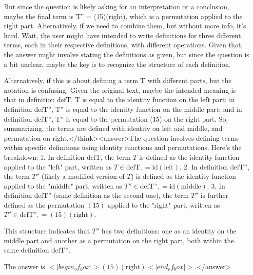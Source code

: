 But since the question is likely asking for an interpretation or a conclusion, maybe the final term is T'' = (15)(right), which is a permutation applied to the right part. Alternatively, if we need to combine them, but without more info, it's hard. Wait, the user might have intended to write definitions for three different terms, each in their respective definitions, with different operations. Given that, the answer might involve stating the definitions as given, but since the question is a bit unclear, maybe the key is to recognize the structure of each definition. 

Alternatively, if this is about defining a term T with different parts, but the notation is confusing. Given the original text, maybe the intended meaning is that in definition defT, T is equal to the identity function on the left part; in definition defT'', T'' is equal to the identity function on the middle part; and in definition defT'', T'' is equal to the permutation (15) on the right part. So, summarizing, the terms are defined with identity on left and middle, and permutation on right.</think><answer>The question involves defining terms within specific definitions using identity functions and permutations. Here's the breakdown:  
1. In definition \( \text{defT} \), the term \( T \) is defined as the identity function applied to the "left" part, written as \( T \in \text{defT}, = \text{id}(\text{left}) \).  
2. In definition \( \text{defT''} \), the term \( T'' \) (likely a modified version of \( T \)) is defined as the identity function applied to the "middle" part, written as \( T'' \in \text{defT''}, = \text{id}(\text{middle}) \).  
3. In definition \( \text{defT''} \) (same definition as the second one), the term \( T'' \) is further defined as the permutation \( (15) \) applied to the "right" part, written as \( T'' \in \text{defT''}, = (15)(\text{right}) \).  

This structure indicates that \( T'' \) has two definitions: one as an identity on the middle part and another as a permutation on the right part, both within the same definition \( \text{defT''} \).  

The answer is \(<|begin_of_box|>(15)(\text{right})<|end_of_box|>\).</answer>